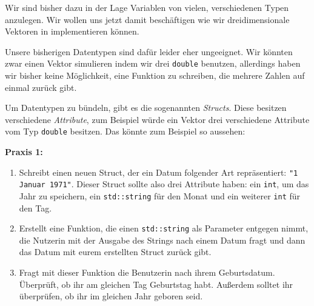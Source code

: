 
Wir sind bisher dazu in der Lage Variablen von vielen, verschiedenen Typen anzulegen.
Wir wollen uns jetzt damit beschäftigen wie wir dreidimensionale Vektoren in \Cpp implementieren können.

Unsere bisherigen Datentypen sind dafür leider eher ungeeignet.
Wir könnten zwar einen Vektor simulieren indem wir drei \texttt{double} benutzen, allerdings haben wir bisher keine Möglichkeit, eine Funktion zu schreiben, die mehrere Zahlen auf einmal zurück gibt.

Um Datentypen zu bündeln, gibt es die sogenannten \emph{Structs}.
Diese besitzen verschiedene \emph{Attribute}, zum Beispiel würde ein Vektor drei verschiedene Attribute vom Typ \texttt{double} besitzen.
Das könnte zum Beispiel so aussehen:


%

\textbf{Praxis 1:}
\begin{enumerate}
    \item Schreibt einen neuen Struct, der ein Datum folgender Art repräsentiert: \texttt{"1 Januar 1971"}.
        Dieser Struct sollte also drei Attribute haben:
        ein \texttt{int}, um das Jahr zu speichern,
        ein \texttt{std::string} für den Monat
        und ein weiterer \texttt{int} für den Tag.

    \item Erstellt eine Funktion, die einen \texttt{std::string} als Parameter entgegen nimmt, die Nutzerin mit der Ausgabe des Strings nach einem Datum fragt und dann das Datum mit eurem erstellten Struct zurück gibt.

    \item Fragt mit dieser Funktion die Benutzerin nach ihrem Geburtsdatum. Überprüft, ob ihr am gleichen Tag Geburtstag habt.
Außerdem solltet ihr überprüfen, ob ihr im gleichen Jahr geboren seid.
\end{enumerate}

